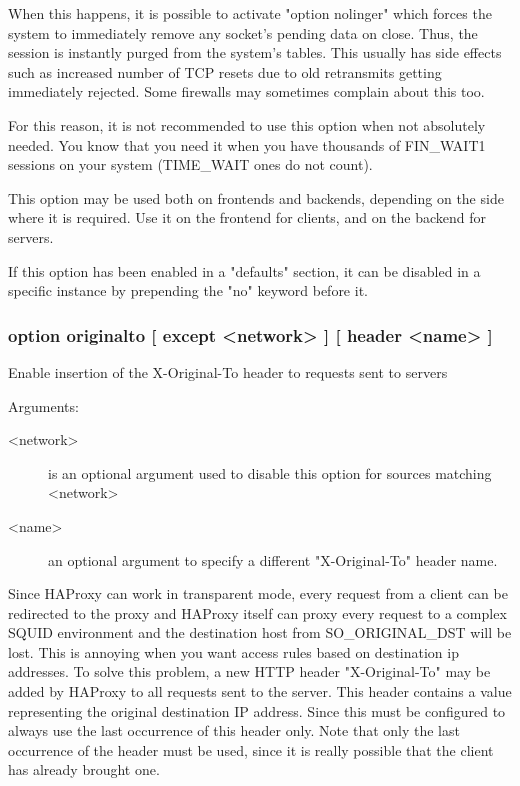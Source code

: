   When this happens, it is possible to activate "option nolinger" which forces
  the system to immediately remove any socket's pending data on close. Thus,
  the session is instantly purged from the system's tables. This usually has
  side effects such as increased number of TCP resets due to old retransmits
  getting immediately rejected. Some firewalls may sometimes complain about
  this too.

  For this reason, it is not recommended to use this option when not absolutely
  needed. You know that you need it when you have thousands of FIN\_WAIT1
  sessions on your system (TIME\_WAIT ones do not count).

  This option may be used both on frontends and backends, depending on the side
  where it is required. Use it on the frontend for clients, and on the backend
  for servers.

  If this option has been enabled in a "defaults" section, it can be disabled
  in a specific instance by prepending the "no" keyword before it.

\subsubsection[option originalto]{option originalto [ except <network> ] [ header <name> ]}


  Enable insertion of the X-Original-To header to requests sent to servers


  Arguments:
\begin{description}
\item[<network>] is an optional argument used to disable this option for sources
              matching <network>
\item[<name>] an optional argument to specify a different "X-Original-To"
              header name.
\end{description}

  Since HAProxy can work in transparent mode, every request from a client can
  be redirected to the proxy and HAProxy itself can proxy every request to a
  complex SQUID environment and the destination host from SO\_ORIGINAL\_DST will
  be lost. This is annoying when you want access rules based on destination ip
  addresses. To solve this problem, a new HTTP header "X-Original-To" may be
  added by HAProxy to all requests sent to the server. This header contains a
  value representing the original destination IP address. Since this must be
  configured to always use the last occurrence of this header only. Note that
  only the last occurrence of the header must be used, since it is really
  possible that the client has already brought one.

